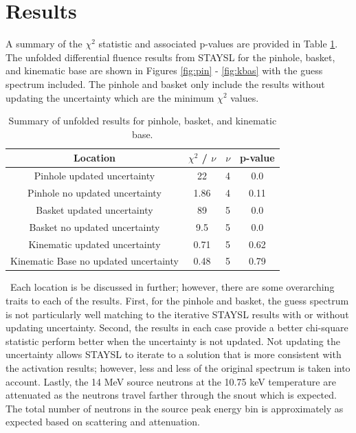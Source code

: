 \documentclass[journal]{IEEEtran}
\let\MYoriglatexcaption\caption
\renewcommand{\caption}[2][\relax]{\MYoriglatexcaption[#2]{#2}}
\begin{document}
\section{Results}


A summary of the $\chi^{2}$ statistic and associated p-values are provided in Table \ref{Table:STAY}. The unfolded differential fluence results from STAYSL for the pinhole, basket, and kinematic base are shown in Figures \ref{fig:pin} - \ref{fig:kbas} with the guess spectrum included. The pinhole and basket only include the results without updating the uncertainty which are the minimum $\chi^{2}$ values. 

\begin{table}[h]
	\caption{Summary of unfolded results for pinhole, basket, and kinematic base.}
	\label{Table:STAY}	
	\centering
	\begin{tabular}{|c|c|c|c|}
		\hline
		Location & $\chi^{2}$ / $\nu$ & $\nu$ & p-value \\ \hline
		Pinhole updated uncertainty & 22 & 4 & 0.0 \\ \hline
		Pinhole no updated uncertainty & 1.86 & 4 & 0.11 \\ \hline
		Basket updated uncertainty & 89 & 5 & 0.0 \\ \hline
		Basket no updated uncertainty & 9.5 & 5 & 0.0 \\ \hline
		Kinematic updated uncertainty & 0.71 & 5 & 0.62 \\ \hline
		Kinematic Base no updated uncertainty & 0.48 & 5 & 0.79 \\ \hline
	\end{tabular}
\end{table}

\ Each location is be discussed in further; however, there are some overarching traits to each of the results. First, for the pinhole and basket, the guess spectrum is not particularly well matching to the iterative STAYSL results with or without updating uncertainty. Second, the results in each case provide a better chi-square statistic perform better when the uncertainty is not updated. Not updating the uncertainty allows STAYSL to iterate to a solution that is more consistent with the activation results; however, less and less of the original spectrum is taken into account. Lastly, the 14 MeV source neutrons at the 10.75 keV temperature are attenuated as the neutrons travel farther through the snout which is expected. The total number of neutrons in the source peak energy bin is approximately as expected based on scattering and attenuation. 
\end{document}
